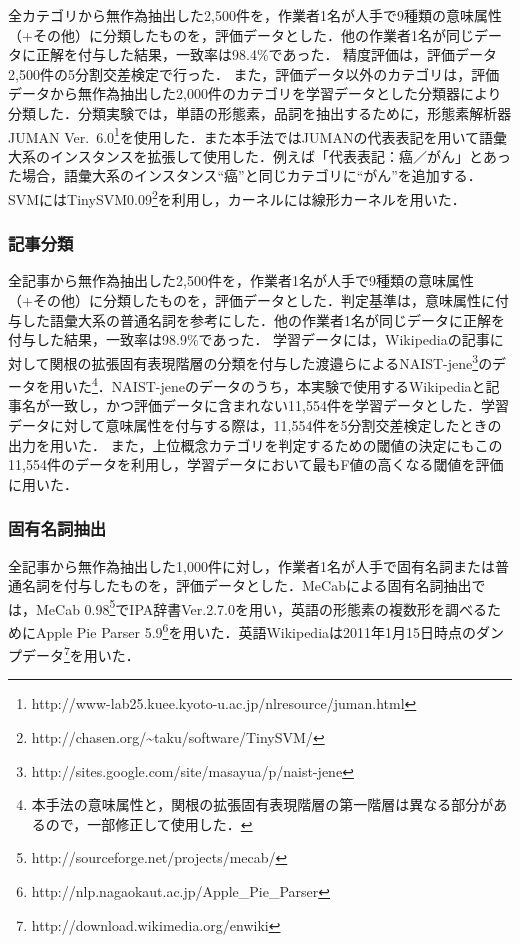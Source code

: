 \documentclass[japanese]{jnlp_1.4}
\begin{document}
全カテゴリから無作為抽出した2,500件を，作業者1名が人手で9種類の意味属性（+その他）に分類したものを，評価データとした．他の作業者1名が同じデータに正解を付与した結果，一致率は98.4\%であった．
精度評価は，評価データ2,500件の5分割交差検定で行った．
また，評価データ以外のカテゴリは，評価データから無作為抽出した2,000件のカテゴリを学習データとした分類器により分類した．分類実験では，単語の形態素，品詞を抽出するために，形態素解析器JUMAN Ver.~6.0\footnote{http://www-lab25.kuee.kyoto-u.ac.jp/nlresource/juman.html}を使用した．また本手法ではJUMANの代表表記を用いて語彙大系のインスタンスを拡張して使用した．例えば「代表表記：癌／がん」とあった場合，語彙大系のインスタンス``癌''と同じカテゴリに``がん''を追加する．SVMにはTinySVM0.09\footnote{http://chasen.org/{\textasciitilde}taku/software/TinySVM/}を利用し，カーネルには線形カーネルを用いた．

\subsubsection{記事分類}

全記事から無作為抽出した2,500件を，作業者1名が人手で9種類の意味属性（+その他）に分類したものを，評価データとした．判定基準は，意味属性に付与した語彙大系の普通名詞を参考にした．他の作業者1名が同じデータに正解を付与した結果，一致率は98.9\%であった．
学習データには，Wikipediaの記事に対して関根の拡張固有表現階層の分類を付与した渡邉らによるNAIST-jene\footnote{http://sites.google.com/site/masayua/p/naist-jene}のデータを用いた\footnote{本手法の意味属性と，関根の拡張固有表現階層の第一階層は異なる部分があるので，一部修正して使用した．}．NAIST-jeneのデータのうち，本実験で使用するWikipediaと記事名が一致し，かつ評価データに含まれない11,554件を学習データとした．学習データに対して意味属性を付与する際は，11,554件を5分割交差検定したときの出力を用いた．
また，上位概念カテゴリを判定するための閾値の決定にもこの11,554件のデータを利用し，学習データにおいて最もF値の高くなる閾値を評価に用いた．

\subsubsection{固有名詞抽出}

全記事から無作為抽出した1,000件に対し，作業者1名が人手で固有名詞または普通名詞を付与したものを，評価データとした．MeCabによる固有名詞抽出では，MeCab 0.98\footnote{http://sourceforge.net/projects/mecab/}でIPA辞書Ver.2.7.0を用い，英語の形態素の複数形を調べるためにApple Pie Parser 5.9\footnote{http://nlp.nagaokaut.ac.jp/Apple\_Pie\_Parser}を用いた．英語Wikipediaは2011年1月15日時点のダンプデータ\footnote{http://download.wikimedia.org/enwiki}を用いた．
\end{document}

